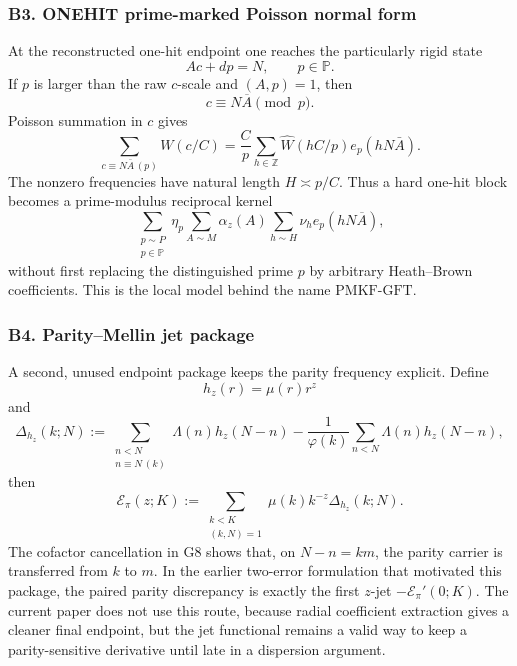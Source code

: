 \documentclass[11pt]{article}
\theoremstyle{definition}
\theoremstyle{remark}
\newcommand{\Pp}{\mathbb P}
\newcommand{\1}{\mathbf 1}
\newcommand{\PMKF}{\mathrm{PMKF}\text{-}\mathrm{GFT}}
\begin{document}
\subsubsection*{B3. ONEHIT prime-marked Poisson normal form}

At the reconstructed one-hit endpoint one reaches the particularly rigid state
\begin{equation}\label{eq:tool-onehit-state}
 Ac+dp=N,
 \qquad p\in\Pp.
\end{equation}
If \(p\) is larger than the raw \(c\)-scale and \((A,p)=1\), then
\[
 c\equiv N\overline A\pmod p.
\]
Poisson summation in \(c\) gives
\begin{equation}\label{eq:tool-onehit-poisson}
 \sum_{c\equiv N\bar A\,(p)}W(c/C)
 =\frac Cp\sum_{h\in\mathbb Z}
 \widehat W(hC/p)e_p(hN\bar A).
\end{equation}
The nonzero frequencies have natural length \(H\asymp p/C\).  Thus a hard
one-hit block becomes a prime-modulus reciprocal kernel
\begin{equation}\label{eq:tool-pmkf-kernel}
 \sum_{\substack{p\sim P\\p\in\Pp}}\eta_p
 \sum_{A\sim M}\alpha_z(A)
 \sum_{h\sim H}\nu_h e_p(hN\overline A),
\end{equation}
without first replacing the distinguished prime \(p\) by arbitrary
Heath--Brown coefficients.  This is the local model behind the name \(\PMKF\).

\subsubsection*{B4. Parity--Mellin jet package}

A second, unused endpoint package keeps the parity frequency explicit.  Define
\[
 h_z(r)=\mu(r)r^z
\]
and
\[
 \Delta_{h_z}(k;N)
 :=\sum_{\substack{n<N\\n\equiv N\, (k)}}\Lambda(n)h_z(N-n)
 -\frac1{\varphi(k)}\sum_{n<N}\Lambda(n)h_z(N-n),
\]
then
\begin{equation}\label{eq:tool-parity-jet}
 \mathcal E_\pi(z;K)
 :=\sum_{\substack{k<K\\(k,N)=1}}
 \mu(k)k^{-z}\Delta_{h_z}(k;N).
\end{equation}
The cofactor cancellation in G8 shows that, on \(N-n=km\), the parity carrier
is transferred from \(k\) to \(m\).  In the earlier two-error formulation that
motivated this package, the paired parity discrepancy is exactly the first
\(z\)-jet \(-\mathcal E_\pi'(0;K)\).  The current paper does not use this route,
because radial coefficient extraction gives a cleaner final endpoint, but the
jet functional remains a valid way to keep a parity-sensitive derivative until
late in a dispersion argument.
\end{document}
